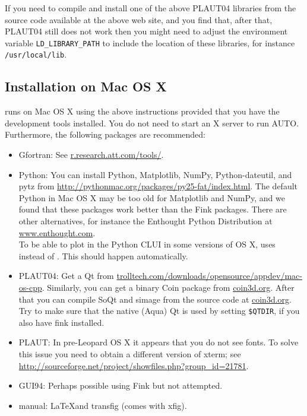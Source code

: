 \documentclass[12pt]{report}
\begin{document}
If you need to compile and install one of the above {\cal PLAUT04} libraries
from the source code available at the above web site, and you
find that, after that, {\cal PLAUT04} still does not work then you might need to
adjust the environment variable {\tt LD\_LIBRARY\_PATH} to include
the location of these libraries, for instance {\tt /usr/local/lib}.

\subsection{Installation on Mac OS X}
\AUTO runs on Mac OS X using the above instructions provided that
you have the development tools
installed. You do not need to start an X server to run AUTO.
Furthermore, the following packages are recommended:
\begin{itemize}
\item Gfortran: See \url{r.research.att.com/tools/}.
\item Python: You can install Python, Matplotlib, NumPy,
  Python-dateutil, and pytz from 
\url{http://pythonmac.org/packages/py25-fat/index.html}.
The default Python in Mac OS X may be too old for Matplotlib and NumPy,
and we found that these packages work better than the Fink packages.
There are other alternatives, for instance the Enthought Python
Distribution at \url{www.enthought.com}.\\
To be able to plot in the Python CLUI in some versions of OS X,
\AUTO uses  instead of .
This should happen automatically.
\item {\cal PLAUT04}: Get a Qt  from
\url{trolltech.com/downloads/opensource/appdev/mac-os-cpp}.
Similarly, you can get a binary Coin package from \url{coin3d.org}.
After that you can compile SoQt and simage from the source code
at \url{coin3d.org}. Try to make sure that the native (Aqua) Qt
is used by setting {\tt \$QTDIR}, if you also have fink installed.
\item {\cal PLAUT}: In pre-Leopard OS X it appears that you do not see
fonts. To solve this issue you need to obtain a different
version of xterm; see
\url{http://sourceforge.net/project/showfiles.php?group_id=21781}.
\item GUI94: Perhaps possible using Fink but not attempted.
\item manual: \LaTeX and transfig (comes with xfig).
\end{itemize}
\end{document}
